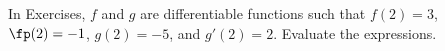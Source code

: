 \begin{exerciseset}{In Exercises}{, $f$ and $g$ are differentiable functions such that $f(2)=3$, $\fp(2)=-1$, $g(2)=-5$, and $g'(2)=2$. Evaluate the expressions.}







\end{exerciseset}
